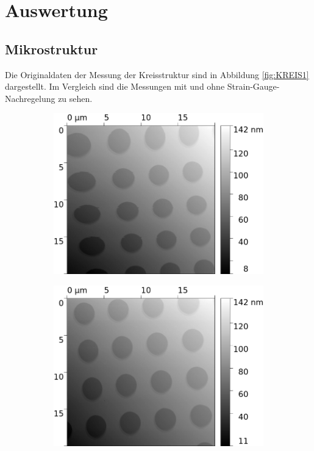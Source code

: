 \newpage
\section{Auswertung}
\label{sec:evaluation}
\subsection{Mikrostruktur}
Die Originaldaten der Messung der Kreisstruktur sind in Abbildung \ref{fig:KREIS1} dargestellt. 
Im Vergleich sind die Messungen mit und ohne Strain-Gauge-Nachregelung zu sehen.

\begin{figure}[H]
    \centering
    \begin{subfigure}{0.49\textwidth}
        \includegraphics[width=\textwidth]{bilder/Mikrostruktur/Kreis2_Res250px_Speed100pps_ohne_Nachregelung.png}
        \caption{}
        \label{fig:A1}
    \end{subfigure}
    \begin{subfigure}{0.49\textwidth}
        \includegraphics[width=\textwidth]{bilder/Mikrostruktur/Kreis2_Res250px_Speed100pps.png}

\end{subfigure}
\end{figure}
